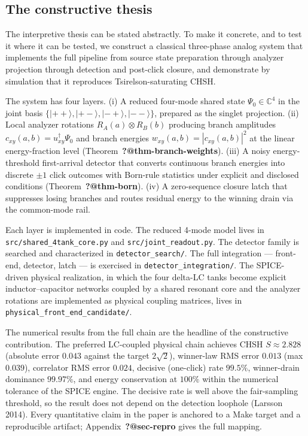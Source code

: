 \documentclass[
  11pt]{article}
\begin{document}
\subsection{The constructive thesis}\label{the-constructive-thesis}

The interpretive thesis can be stated abstractly. To make it concrete,
and to test it where it can be tested, we construct a classical
three-phase analog system that implements the full pipeline from source
state preparation through analyzer projection through detection and
post-click closure, and demonstrate by simulation that it reproduces
Tsirelson-saturating CHSH.

The system has four layers. (i) A reduced four-mode shared state
\(\Psi_0 \in \mathbb{C}^4\) in the joint basis
\(\{|{++}\rangle, |{+-}\rangle, |{-+}\rangle, |{--}\rangle\}\), prepared
as the singlet projection. (ii) Local analyzer rotations
\(R_A(a) \otimes R_B(b)\) producing branch amplitudes
\(c_{xy}(a,b) = u_{xy}^\dagger \Psi_0\) and branch energies
\(w_{xy}(a,b) = |c_{xy}(a,b)|^2\) at the linear energy-fraction level
(Theorem~\textbf{?@thm-branch-weights}). (iii) A noisy energy-threshold
first-arrival detector that converts continuous branch energies into
discrete \(\pm 1\) click outcomes with Born-rule statistics under
explicit and disclosed conditions (Theorem~\textbf{?@thm-born}). (iv) A
zero-sequence closure latch that suppresses losing branches and routes
residual energy to the winning drain via the common-mode rail.

Each layer is implemented in code. The reduced 4-mode model lives in
\texttt{src/shared\_4tank\_core.py} and \texttt{src/joint\_readout.py}.
The detector family is searched and characterized in
\texttt{detector\_search/}. The full integration --- front-end,
detector, latch --- is exercised in \texttt{detector\_integration/}. The
SPICE-driven physical realization, in which the four delta-LC tanks
become explicit inductor--capacitor networks coupled by a shared
resonant core and the analyzer rotations are implemented as physical
coupling matrices, lives in \texttt{physical\_front\_end\_candidate/}.

The numerical results from the full chain are the headline of the
constructive contribution. The preferred LC-coupled physical chain
achieves CHSH \(S \approx 2.828\) (absolute error \(0.043\) against the
target \(2\sqrt{2}\)), winner-law RMS error \(0.013\) (max \(0.039\)),
correlator RMS error \(0.024\), decisive (one-click) rate \(99.5\%\),
winner-drain dominance \(99.97\%\), and energy conservation at \(100\%\)
within the numerical tolerance of the SPICE engine. The decisive rate is
well above the fair-sampling threshold, so the result does not depend on
the detection loophole (Larsson 2014). Every quantitative claim in the
paper is anchored to a Make target and a reproducible artifact;
Appendix~\textbf{?@sec-repro} gives the full mapping.
\end{document}
